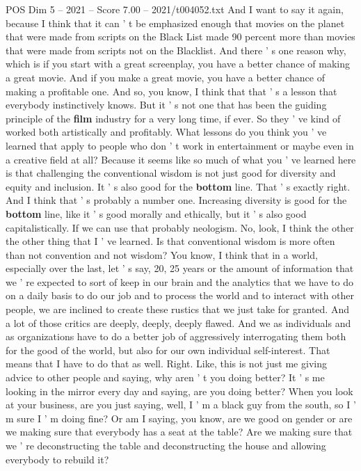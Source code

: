 \begin{textsample}{POS Dim 5 – 2021 – Score 7.00 – 2021/t004052.txt}
And I want to say it again, because I think that it can ' t be emphasized enough that movies on the planet that were made from scripts on the Black List made 90 percent more than movies that were made from scripts not on the Blacklist.
And there ' s one reason why, which is if you start with a great screenplay, you have a better chance of making a great movie.
And if you make a great movie, you have a better chance of making a profitable one.
And so, you know, I think that that ' s a lesson that everybody instinctively knows.
But it ' s not one that has been the guiding principle of the \textbf{film} industry for a very long time, if ever.
So they ' ve kind of worked both artistically and profitably.
What lessons do you think you ' ve learned that apply to people who don ' t work in entertainment or maybe even in a creative field at all?
Because it seems like so much of what you ' ve learned here is that challenging the conventional wisdom is not just good for diversity and equity and inclusion.
It ' s also good for the \textbf{bottom} line.
That ' s exactly right.
And I think that ' s probably a number one.
Increasing diversity is good for the \textbf{bottom} line, like it ' s good morally and ethically, but it ' s also good capitalistically.
If we can use that probably neologism.
No, look, I think the other the other thing that I ' ve learned.
Is that conventional wisdom is more often than not convention and not wisdom?
You know, I think that in a world, especially over the last, let ' s say, 20, 25 years or the amount of information that we ' re expected to sort of keep in our brain and the analytics that we have to do on a daily basis to do our job and to process the world and to interact with other people, we are inclined to create these rustics that we just take for granted.
And a lot of those critics are deeply, deeply, deeply flawed.
And we as individuals and as organizations have to do a better job of aggressively interrogating them both for the good of the world, but also for our own individual self-interest.
That means that I have to do that as well.
Right.
Like, this is not just me giving advice to other people and saying, why aren ' t you doing better?
It ' s me looking in the mirror every day and saying, are you doing better?
When you look at your business, are you just saying, well, I ' m a black guy from the south, so I ' m sure I ' m doing fine?
Or am I saying, you know, are we good on gender or are we making sure that everybody has a seat at the table?
Are we making sure that we ' re deconstructing the table and deconstructing the house and allowing everybody to rebuild it?

\end{textsample}
